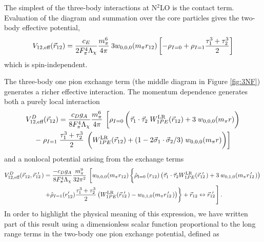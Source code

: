 The simplest of the three-body interactions at N$^2$LO is the contact term. Evaluation of the diagram and summation over the core particles gives the two-body effective potential,
\begin{equation}
V_{12,\text{eff}}(\vec{r}_{12})=\frac{c_E }{2F_\pi^4\Lambda_\chi}\frac{m_\pi^6}{4\pi}\:3w_{0,0,0}(m_\pi r_{12})\left[-\rho_{I=0}+ \rho_{I=1}\frac{\tau_1^3+\tau_2^3}{2} \right]
\end{equation}
which is spin-independent.

The three-body one pion exchange term (the middle diagram in Figure \ref{fig:3NF}) generates a richer effective interaction. The momentum dependence generates both a purely local interaction
\begin{multline}
V^{D}_{12,\text{eff}}(\rot)=
\frac{c_D g_A}{8 F_\pi^4 \Lambda_\chi} \frac{m_\pi^6}{4\pi}\: \left[\rho_{I=0}\left(\fracphantom\taudot\; W^{\text{LR}}_{1PE}(\rot)  +3\;\w{0}{0}{0}{m_\pi r}\right) \right. \\
-\left. \rho_{I=1}\;\tauplusthree \;\left(\fracphantom W^{\text{LR}}_{1PE}(\rot)+(1-2\sigmadot/3)\;\w{0}{0}{0}{m_\pi r}\right) \right]
\end{multline}
and a nonlocal potential arising from the exchange terms 
\begin{multline}\label{eq:1PENonlocal}
V^{D}_{12,\text{eff}}(\rot,\rotp)=\frac{-c_D g_A }{8 F_\pi^4 \Lambda_\chi} \frac{m_\pi^9}{32\pi^2}\:  \left[ \w{0}{0}{0}{m_\pi r_{12}} \left\{\fracphantom \rhohat{0}{r_{12}}\left(\taudot W^{\text{LR}}_{1PE}(\rotp)+3\:\w{0}{1}{0}{m_\pi \rotpr}\right) \right.\right. \\
\left.\left.+\hat{\rho}_{I=1}(r'_{12}) \tauplusthree \left( W^{\text{LR}}_{1PE}(\rotp)-\w{0}{1}{0}{m_\pi \rotpr}\right) \right\} + \rot \leftrightarrow \rotp \vphantom{\left(\yukawa{r}^2\right)} \right].
\end{multline}
In order to highlight the physical meaning of this expression, we have written part of this result using a dimensionless scalar function proportional to the long range terms in the two-body one pion exchange potential, defined as
